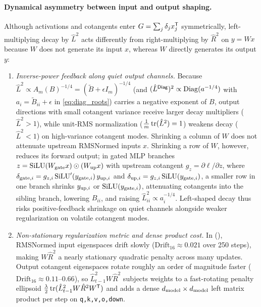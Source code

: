\paragraph{Dynamical asymmetry between input and output shaping.}
Although activations and cotangents enter $G=\sum_j\delta_j x_j^{{\mathsf{T}}}$ symmetrically, left-multiplying decay by $\hat L^2$ acts differently from right-multiplying by $\hat R^2$ on $y=Wx$ because $W$ does not generate its input $x$, whereas $W$ directly generates its output $y$:
\begin{enumerate}
 \item \emph{Inverse-power feedback along quiet output channels.} Because $\hat L^2\propto A_m(B)^{-1/4}=(\tilde B+\epsilon I_m)^{-1/4}$ (and $(\hat L^{\mathsf{Diag}})^2\propto\operatorname{Diag}(a^{-1/4})$ with $a_i=\tilde B_{ii}+\epsilon$ in \cref{eq:diag_roots}) carries a negative exponent of $B$, output directions with small cotangent variance receive larger decay multipliers ($\hat L^2>1$), while unit-RMS normalization ($\frac{1}{m}\operatorname{tr}(\hat L^2)=1$) weakens decay ($\hat L^2<1$) on high-variance cotangent modes. Shrinking a column of $W$ does not attenuate upstream RMSNormed inputs $x$. Shrinking a row of $W$, however, reduces its forward output; in gated MLP branches $z=\operatorname{SiLU}(W_{\rm gate}x)\odot(W_{\rm up}x)$ with upstream cotangent $g_z=\partial\ell/\partial z$, where $\delta_{{\rm gate},i}=g_{z,i}\operatorname{SiLU}'(y_{{\rm gate},i})\,y_{{\rm up},i}$ and $\delta_{{\rm up},i}=g_{z,i}\operatorname{SiLU}(y_{{\rm gate},i})$, a smaller row in one branch shrinks $y_{{\rm up},i}$ or $\operatorname{SiLU}(y_{{\rm gate},i})$, attenuating cotangents into the sibling branch, lowering $B_{ii}$, and raising $\hat L_{ii}^2\propto a_i^{-1/4}$. Left-shaped decay thus risks positive-feedback shrinkage on quiet channels alongside weaker regularization on volatile cotangent modes.
 \item \emph{Non-stationary regularization metric and dense product cost.} In  (), RMSNormed input eigenspaces drift slowly ($\mathrm{Drift}_{16}\approx 0.021$ over 250 steps), making $W\hat R^2$ a nearly stationary quadratic penalty across many updates. Output cotangent eigenspaces rotate roughly an order of magnitude faster ($\mathrm{Drift}_{16}\approx 0.11\text{--}0.66$), so $\hat L_{t-1}^2 W\hat R^2$ subjects weights to a fast-rotating penalty ellipsoid $\frac{\lambda}{2}\operatorname{tr}(\hat L_{t-1}^2 W\hat R^2 W^{{\mathsf{T}}})$ and adds a dense $d_{\mathrm{model}}\times d_{\mathrm{model}}$ left matrix product per step on \texttt{q,k,v,o,down}.
\end{enumerate}

